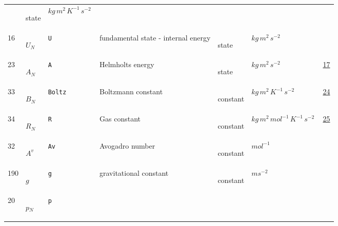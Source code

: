 \begin{longtable}{|p{1cm}|p{2.5cm}|p{4.5cm}|p{8cm}|p{3.0cm}|p{3cm}|p{1cm}|}
             & \begin{lay}state \end{lay}
             & $ kg \,m^{2} \,K^{-1} \,s^{-2} \, $
             & \\
            16
             & \hypertarget{"v:16"}{ $ {U}{_{N}} $}
             & \verb|U|
             & fundamental state - internal energy
             & \begin{lay}state \end{lay}
             & $ kg \,m^{2} \,s^{-2} \, $
             & \\
            23
             & \hypertarget{"v:23"}{ $ {A}{_{N}} $}
             & \verb|A|
             & Helmholts energy
             & \begin{lay}state \end{lay}
             & $ kg \,m^{2} \,s^{-2} \, $
             &                 \hyperlink{"e:17"}{ 17 }
                 \\
            33
             & \hypertarget{"v:33"}{ $ {B}{_{N}} $}
             & \verb|Boltz|
             & Boltzmann constant
             & \begin{lay}constant \end{lay}
             & $ kg \,m^{2} \,K^{-1} \,s^{-2} \, $
             &                 \hyperlink{"e:24"}{ 24 }
                 \\
            34
             & \hypertarget{"v:34"}{ $ {R}{_{N}} $}
             & \verb|R|
             & Gas constant
             & \begin{lay}constant \end{lay}
             & $ kg \,m^{2} \,mol^{-1} \,K^{-1} \,s^{-2} \, $
             &                 \hyperlink{"e:25"}{ 25 }
                 \\
            32
             & \hypertarget{"v:32"}{ $ {{A^v}}{_{}} $}
             & \verb|Av|
             & Avogadro number
             & \begin{lay}constant \end{lay}
             & $ mol^{-1} \, $
             & \\
            190
             & \hypertarget{"v:190"}{ $ {g}{_{}} $}
             & \verb|g|
             & gravitational constant
             & \begin{lay}constant \end{lay}
             & $ m s^{-2} \, $
             & \\
            20
             & \hypertarget{"v:20"}{ $ {p}{_{N}} $}
             & \verb|p|

\end{longtable}
